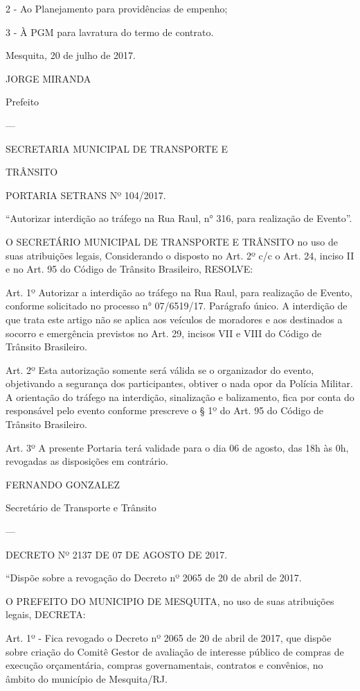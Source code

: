 \documentclass{doliberto}
\begin{document}
2 - Ao Planejamento para providências de empenho; 
 
3 - À PGM para lavratura do termo de contrato. 
 

Mesquita, 20 de julho de 2017. 
 

JORGE MIRANDA 

Prefeito 

---

SECRETARIA MUNICIPAL DE TRANSPORTE E 

TRÂNSITO 

 

PORTARIA SETRANS Nº 104/2017. 

“Autorizar  interdição  ao  tráfego  na  Rua  Raul,  n°  316,  para 
realização de Evento”. 
 
O  SECRETÁRIO  MUNICIPAL  DE  TRANSPORTE  E 
TRÂNSITO no uso de suas atribuições legais,  
Considerando o disposto no Art. 2º c/c o Art. 24, inciso II e 
no Art. 95 do Código de Trânsito Brasileiro,  
RESOLVE:  
 
Art. 1º Autorizar a interdição ao tráfego na Rua Raul, para 
realização  de  Evento,  conforme  solicitado  no  processo  n° 
07/6519/17.  
Parágrafo único. A interdição de que trata este artigo não se 
aplica  aos  veículos  de  moradores  e  aos  destinados  a 
socorro e emergência previstos no Art. 29, incisos VII e VIII 
do Código de Trânsito Brasileiro.  
 
Art.  2º  Esta  autorização  somente  será  válida  se  o 
organizador  do  evento,  objetivando  a  segurança  dos 
participantes, obtiver o nada opor da Polícia Militar.  A 
orientação  do  tráfego  na  interdição,  sinalização  e 
balizamento, fica por conta do responsável pelo evento 
conforme  prescreve  o  §  1º  do  Art.  95  do  Código  de 
Trânsito Brasileiro.  
 
Art.  3º  A  presente  Portaria  terá  validade  para  o  dia  06  de 
agosto,  das  18h  às  0h,  revogadas  as  disposições  em 
contrário. 
 

FERNANDO GONZALEZ 

Secretário de Transporte e Trânsito 

---

DECRETO Nº 2137 DE 07 DE AGOSTO DE 2017. 
 
 “Dispõe  sobre  a  revogação  do  Decreto  nº  2065  de  20  de 
abril de 2017.  
 
O  PREFEITO  DO  MUNICIPIO  DE  MESQUITA,  no  uso  de 
suas atribuições legais,  
DECRETA: 
 
Art. 1º - Fica revogado o Decreto nº 2065 de 20 de abril de 
2017,  que  dispõe  sobre  criação  do  Comitê  Gestor  de 
avaliação  de  interesse  público  de  compras  de  execução 
orçamentária,  compras  governamentais,  contratos  e 
convênios, no âmbito do município de Mesquita/RJ. 
 
\end{document}
